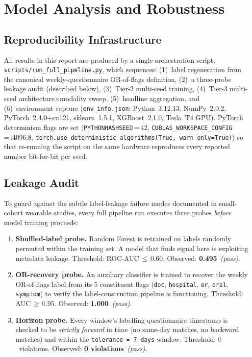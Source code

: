 \documentclass[11pt,a4paper]{article}
\begin{document}
\section{Model Analysis and Robustness}\label{sec:analysis}

\subsection{Reproducibility Infrastructure}

All results in this report are produced by a single orchestration script,
\texttt{scripts/run\_full\_pipeline.py}, which sequences:
(1)~label regeneration from the canonical weekly-questionnaire OR-of-flags
definition, (2)~a three-probe leakage audit (described below), (3)~Tier-2
multi-seed training, (4)~Tier-3 multi-seed architecture$\times$modality
sweep, (5)~headline aggregation, and (6)~environment capture
(\texttt{env\_info.json}: Python~3.12.13, NumPy~2.0.2, PyTorch~2.4.0+cu121,
sklearn~1.5.1, XGBoost~2.1.0, Tesla~T4 GPU).  PyTorch determinism flags are
set
(\texttt{PYTHONHASHSEED}\,=\,42, \texttt{CUBLAS\_WORKSPACE\_CONFIG}\,=\,:4096:8,
\texttt{torch.use\_deterministic\_algorithms(True, warn\_only=True)}) so that
re-running the script on the same hardware reproduces every reported number
bit-for-bit per seed.

\subsection{Leakage Audit}\label{sec:leakage}

To guard against the subtle label-leakage failure modes documented in
small-cohort wearable studies, every full pipeline run executes three
probes \emph{before} model training proceeds:

\begin{enumerate}[nosep]
  \item \textbf{Shuffled-label probe.}  Random Forest is retrained on
        labels randomly permuted within the training set.  A model that
        finds signal here is exploiting metadata leakage.  Threshold:
        ROC-AUC\,$\leq$\,0.60.  Observed: \textbf{0.495}~\textit{(pass)}.
  \item \textbf{OR-recovery probe.}  An auxiliary classifier is trained to
        recover the weekly OR-of-flags label from its 5 constituent flags
        (\texttt{doc}, \texttt{hospital}, \texttt{er}, \texttt{oral},
        \texttt{symptom}) to verify the label-construction pipeline is
        functioning.  Threshold: AUC\,$\geq$\,0.95.  Observed:
        \textbf{1.000}~\textit{(pass)}.
  \item \textbf{Horizon probe.}  Every window's labelling-questionnaire
        timestamp is checked to be \emph{strictly forward} in time (no
        same-day matches, no backward matches) and within the
        \texttt{tolerance\,=\,7\,days} window.  Threshold:
        $0$~violations.  Observed: \textbf{0 violations}~\textit{(pass)}.
\end{enumerate}
\end{document}
